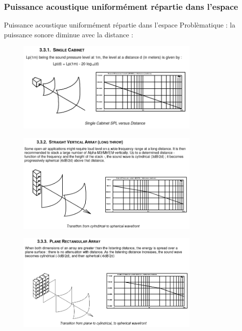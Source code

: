 \documentclass[aspectratio=169]{beamer}
\begin{document}
\subsubsection{Puissance acoustique uniformément répartie dans l'espace}
\begin{frame}{Puissance acoustique uniformément répartie dans l'espace}
Problèmatique : la puissance sonore diminue avec la distance : 
  	\begin{figure}[!h]
	\includegraphics[width=0.8\textwidth]{figure/disp_sphere.png}
	\end{figure}
\end{frame}
\begin{frame}
  	\begin{figure}[!h]
	\includegraphics[width=0.8\textwidth]{figure/disp_cylindre.png}
	\end{figure}
\end{frame}
\begin{frame}
  	\begin{figure}[!h]
	\includegraphics[width=0.8\textwidth]{figure/disp_plan.png}
	\end{figure}
\end{frame}
\end{document}
